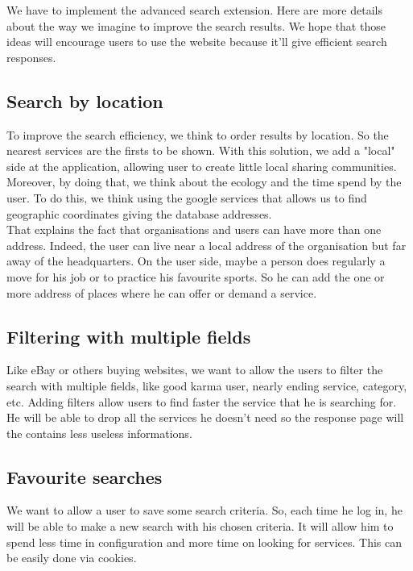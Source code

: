 We have to implement the advanced search extension. Here are more details about the way we imagine to improve the search results. We hope that those ideas will encourage users to use the website because it'll give efficient search responses.


\subsection{Search by location}
To improve the search efficiency, we think to order results by location. So the nearest services are the firsts to be shown.
With this solution, we add a "local" side at the application, allowing user to create little local sharing communities.
Moreover, by doing that, we think about the ecology and the time spend by the user.
To do this, we think using the google services that allows us to find geographic coordinates giving the database addresses.\\
That explains the fact that organisations and users can have more than one address. Indeed, the user can live near a local address of the organisation but far away of the headquarters. On the user side, maybe a person does regularly a move for his job or to practice his favourite sports. So he can add the one or more address of places where he can offer or demand a service.

\subsection{Filtering with multiple fields}
Like eBay or others buying websites, we want to allow the users to filter the search with multiple fields, like good karma user, nearly ending service, category, etc. Adding filters allow users to find faster the service that he is searching for. He will be able to drop all the services he doesn't need so the response page will the contains less useless informations.

\subsection{Favourite searches}
We want to allow a user to save some search criteria. So, each time he log in, he will be able to make a new search with his chosen criteria.
It will allow him to spend less time in configuration and more time on looking for services. 
This can be easily done via cookies.
